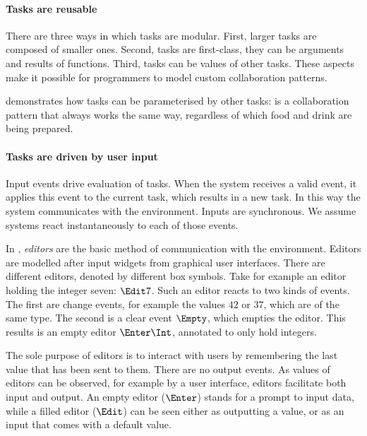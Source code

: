 \paragraph{Tasks are reusable}

There are three ways in which tasks are modular.
First, larger tasks are composed of smaller ones.
Second, tasks are first-class, they can be arguments and results of functions.
Third, tasks can be values of other tasks.
These aspects make it possible for programmers to model custom collaboration patterns.

 demonstrates how tasks can be parameterised by other tasks:  is a collaboration pattern that always works the same way, regardless of which food and drink are being prepared.



\paragraph{Tasks are driven by user input}

Input events drive evaluation of tasks.
When the system receives a valid event, it applies this event to the current task, which results in a new task.
In this way the system communicates with the environment.
Inputs are synchronous.
We assume systems react instantaneously to each of those events.

In \TOPHAT, \emph{editors} are the basic method of communication with the environment.
Editors are modelled after input widgets from graphical user interfaces.
There are different editors, denoted by different box symbols.
Take for example an editor holding the integer seven: $\Edit 7$.
Such an editor reacts to two kinds of events.
The first are change events, for example the values $42$ or $37$, which are of the same type.
The second is a clear event $\Empty$, which empties the editor.
This results is an empty editor $\Enter \Int$, annotated to only hold integers.


The sole purpose of editors is to interact with users by remembering the last value that has been sent to them.
There are no output events.
As values of editors can be observed, for example by a user interface, editors facilitate both input and output.
An empty editor ($\Enter$) stands for a prompt to input data,
while a filled editor ($\Edit$) can be seen either as outputting a value, or as an input that comes with a default value.



